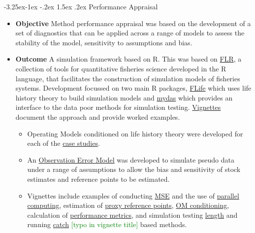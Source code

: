 \documentclass[a4paper, 10pt]{article}
\makeatletter
\newcommand{\coilin}{\textcolor{green}}
\renewcommand{\subsection}{\@startsection{subsection}{2}{\z@}%
 {-3.25ex\@plus -1ex \@minus -.2ex}%
 {1.5ex \@plus .2ex}%
 {\normalfont\bfseries\slshape}}
\makeatother
\begin{document}
\subsection{Performance Appraisal}
 
\begin{itemize}[labelindent=\parindent,noitemsep,topsep=0pt,parsep=0pt,partopsep=0pt]
 \item \textbf{Objective} Method performance appraisal was based on the development of a set of diagnostics that can be applied across a range of models to assess the stability of the model, sensitivity to assumptions and bias.
 
 \item \textbf{Outcome} A simulation framework based on R. This was based on \href{http://www.flr-project.org/}{FLR}, a collection of tools for quantitative fisheries science developed in the R language, that facilitates the construction of simulation models of fisheries systems. Development focussed on two main R packages, \href{https://github.com/flr/flife}{FLife} which uses life history theory to build simulation models and 
    \href{https://github.com/flr/mydas/wiki}{mydas} which provides an interface to the data poor methods for simulation testing. \href{https://3o2y9wugzp1kfxr5hvzgzq-on.drv.tw/MyDas/vignettes.html}{Vignettes} document the approach and provide worked examples. 
    \begin{itemize}
   \item Operating Models conditioned on life history theory were developed for each of the 
    \href{https://3o2y9wugzp1kfxr5hvzgzq-on.drv.tw/MyDas/om.html}{case studies}.
    \item An \href{https://3o2y9wugzp1kfxr5hvzgzq-on.drv.tw/MyDas/vignettes/oemod.html}{Observation Error Model} was developed to simulate pseudo data under a range of assumptions to allow the bias and sensitivity of stock estimates and reference points to be estimated.    
    \item Vignettes include examples of conducting \href{https://3o2y9wugzp1kfxr5hvzgzq-on.drv.tw/MyDas/vignettes/mse.html}{MSE} and the use of \href{https://3o2y9wugzp1kfxr5hvzgzq-on.drv.tw/MyDas/vignettes/parallel.html}{parallel computing}, estimation of
    \href{https://3o2y9wugzp1kfxr5hvzgzq-on.drv.tw/MyDas/vignettes/proxies.html}{proxy reference points},  \href{https://3o2y9wugzp1kfxr5hvzgzq-on.drv.tw/MyDas/vignettes/turbot.html}{OM conditioning}, calculation of \href{https://3o2y9wugzp1kfxr5hvzgzq-on.drv.tw/MyDas/vignettes/performance.html}{performance metrics}, and simulation testing \href{https://3o2y9wugzp1kfxr5hvzgzq-on.drv.tw/MyDas/vignettes/length.html}{length} and running    \href{https://3o2y9wugzp1kfxr5hvzgzq-on.drv.tw/MyDas/vignettes/sra.html}{catch} \coilin{[typo in vignette title]} based methods.
    \end{itemize}
\end{itemize}
\end{document}

